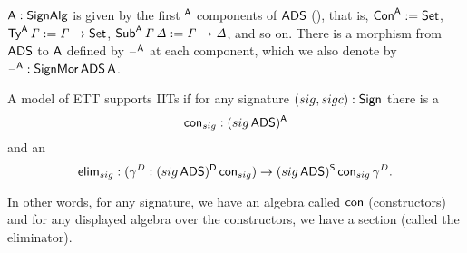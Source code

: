 \documentclass[a4paper,UKenglish,cleveref, autoref]{lipics-v2019}
\begin{document}
\begin{definition}\label{def:a}
  $\mathsf{A} : \mathsf{SignAlg}$ is given by the first $^{\mathsf{A}}$ components of $\mathsf{ADS}$
  (), that is, $\mathsf{Con}^{\mathsf{A}} := \mathsf{Set}$,
  $\mathsf{Ty}^{\mathsf{A}}\,\mathit{\Gamma} := \mathit{\Gamma}\rightarrow\mathsf{Set}$,
  $\mathsf{Sub}^{\mathsf{A}}\,\mathit{\Gamma}\,\mathit{\Delta} := \mathit{\Gamma}\rightarrow\mathit{\Delta}$, and so on. There is a
  morphism from $\mathsf{ADS}$ to $\mathsf{A}$ defined by $\mathord{\hspace{1pt}\text{--}\hspace{1pt}}^{\mathsf{A}}$ at each
  component, which we also denote by $\mathord{\hspace{1pt}\text{--}\hspace{1pt}}^{\mathsf{A}} : \mathsf{SignMor}\,\mathsf{ADS}\,\mathsf{A}$.
\end{definition}

\begin{definition}\label{def:hasiits}
  A model of ETT supports IITs if for any signature $(sig,sigc):\mathsf{Sign}$
  there is a
  \[
    \mathsf{con}_{sig}: ({sig}\,\mathsf{ADS})^{\mathsf{A}}
  \]
  and an
  \[
    \mathsf{elim}_{sig} : (\gamma^D:({sig}\,\mathsf{ADS})^{\mathsf{D}}\,\mathsf{con}_{sig})\rightarrow ({sig}\,\mathsf{ADS})^{\mathsf{S}}\,\mathsf{con}_{sig}\,\gamma^D.
  \]
\end{definition}
In other words, for any signature, we have an algebra called $\mathsf{con}$
(constructors) and for any displayed algebra over the constructors, we
have a section (called the eliminator).
\end{document}
